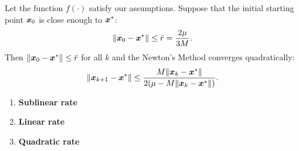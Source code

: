 \begin{thm}
    Let the function \(f(\cdot)\) satisfy our assumptions. Suppose that the initial starting point \(\bm{x}_0\) is close enough to \(\bm{x}^*\):
    \[
        \norm{\bm{x}_0 - \bm{x}^*} \le \bar{r} = \frac{2\mu}{3M}.   
    \]
    Then \(\norm{\bm{x}_0 - \bm{x}^*} \le \bar{r}\) for all \(k\) and the Newton's Method converges quadratically:
    \[
        \norm{\bm{x}_{k+1} - \bm{x}^*} \le \frac{M \norm{\bm{x}_k - \bm{x}^*}}{2(\mu - M\norm{\bm{x}_k -\bm{x}^*})}.  
    \]
\end{thm}

\begin{enumerate}
    \item \textbf{Sublinear rate}
    \item \textbf{Linear rate}
    \item \textbf{Quadratic rate}
\end{enumerate}